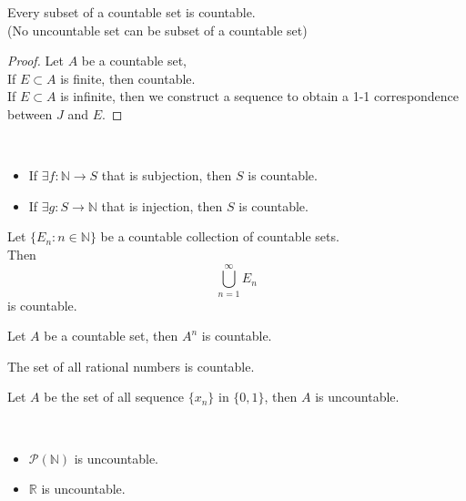 \begin{prop} Every subset of a countable set is countable.
    \\ (No uncountable set can be subset of a countable set)
\end{prop}
\begin{proof}
Let $A$ be a countable set,
\\If $E \subset A$ is finite, then countable.
\\If $E \subset A$ is infinite, then we construct a sequence to obtain a 1-1 correspondence between $J$ and $E$.
\end{proof}

\begin{lemma} ~
    \begin{itemize}
        \item If $\exists f: \mathbb{N}\to S$ that is subjection, then $S$ is countable.
        \item If $\exists g: S\to \mathbb{N}$ that is injection, then $S$ is countable. 
    \end{itemize}
\end{lemma}

\begin{prop} Let $\{ E_n : n \in \mathbb{N}\}$ be a countable collection of countable sets. \\
    Then $$
    \bigcup_{n = 1}^{\infty}E_n
    $$
is countable.
\end{prop}

\begin{prop}Let $A$ be a countable set, then $A^{n}$ is countable.
\end{prop}
\begin{corollary}
The set of all rational numbers is countable.
\end{corollary}

\begin{prop}Let $A$ be the set of all sequence $\{ x_n \}$ in $\{ 0,1 \}$, then $A$ is uncountable.
\end{prop}

\begin{corollary} ~
\begin{itemize}
    \item $\mathcal{P}(\mathbb{N})$ is uncountable.
    \item $\mathbb{R}$ is uncountable.
\end{itemize}
\end{corollary}

